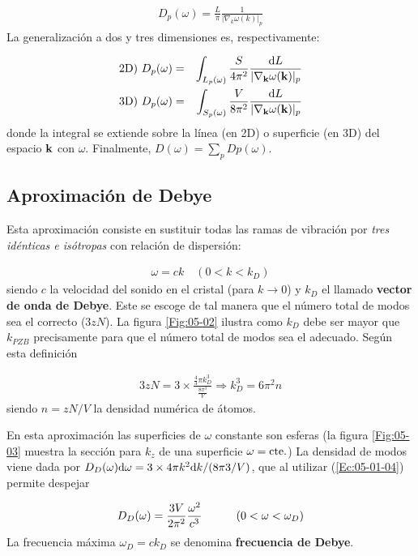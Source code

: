 \begin{eqnarray}
	D_p (\omega)  = \frac{L}{\pi} \frac{1}{|\nabla_ k \omega (k)|_p }
\end{eqnarray}
La generalización a dos y tres dimensiones es, respectivamente:

\begin{eqnarray}
	\text{2D}) \  D_p (\omega) &=& \int_{L_p (\omega)} \frac{S}{4\pi^2} \frac{\mathrm{d} L}{|\nabla_{\mathbf{k}} \omega(\mathbf{k})|_p} \\ 
	\text{3D}) \  D_p (\omega) &=& \int_{S_p (\omega)} \frac{V}{8\pi^2} \frac{\mathrm{d} L}{|\nabla_{\mathbf{k}} \omega(\mathbf{k})|_p} \label{Ec:05-01-04}
\end{eqnarray}
donde la integral se extiende sobre la línea (en 2D) o superficie (en 3D) del espacio $\mathbf{k}$ con $\omega$. Finalmente, $D(\omega)=\sum_p Dp (\omega)$.
 
\subsection{Aproximación de Debye}    

Esta aproximación consiste en sustituir todas las ramas de vibración por \textit{tres idénticas e isótropas} con relación de dispersión:

\begin{eqnarray}
	\omega = c k \quad (0<k<k_D)
\end{eqnarray}
siendo $c$ la velocidad del sonido en el cristal (para $k\rightarrow 0$) y $k_D$ el llamado \textbf{vector de onda de Debye}. Este se escoge de tal manera que el número total de modos sea el correcto ($3zN$). La figura \ref{Fig:05-02} ilustra como $k_D$ debe ser mayor que $k_{PZB}$ precisamente para que el número total de modos sea el adecuado. Según esta definición

\begin{eqnarray}
	3zN = 3 \times \frac{\frac{4}{3} \pi k^3_D}{\frac{8 \pi^3}{V}} \Rightarrow k_D^3 = 6 \pi^2 n
\end{eqnarray}
siendo $n=zN/V$ la densidad numérica de átomos. 

En esta aproximación las superficies de $\omega$ constante son esferas (la figura \ref{Fig:05-03} muestra la sección para $k_z$ de una superficie $\omega=\text{cte}.$) La densidad de modos viene dada por $D_D(\omega) \mathrm{d} \omega = 3 \times 4 \pi k^2 \mathrm{d} k / (8\pi3 /V)$, que al utilizar (\ref{Ec:05-01-04}) permite despejar 

\begin{eqnarray}
	D_D (\omega) = \frac{3V}{2\pi^2} \frac{\omega^2}{c^3} \quad \quad \quad (0<\omega<\omega_D)
    \label{Ec:05-01-07}
\end{eqnarray}
La frecuencia máxima $\omega_D=ck_D$ se denomina \textbf{frecuencia de Debye}. 


